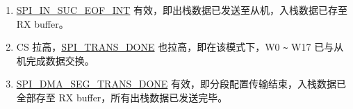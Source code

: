 \documentclass[main\_\_CN.tex]{subfiles}
\begin{document}
\begin{tiplisting}
\vspace{-2em}
\begin{enumerate}

\item \hyperref[int:SPIINSUCEOFINT]{SPI\_IN\_SUC\_EOF\_INT} 有效，即出栈数据已发送至从机，入栈数据已存至 RX buffer。\label{spi-note1}

\item CS 拉高，\hyperref[fielddesc:SPITRANSDONE]{SPI\_TRANS\_DONE} 也拉高，即在该模式下，W0 \verb+~+ W17 已与从机完成数据交换。\label{spi-note2}

\item \hyperref[fielddesc:SPIDMASEGTRANSDONE]{SPI\_DMA\_SEG\_TRANS\_DONE} 有效，即分段配置传输结束，入栈数据已全部存至 RX buffer，所有出栈数据已发送完毕。\label{note3}
\end{enumerate}
\end{tiplisting}
\end{document}
